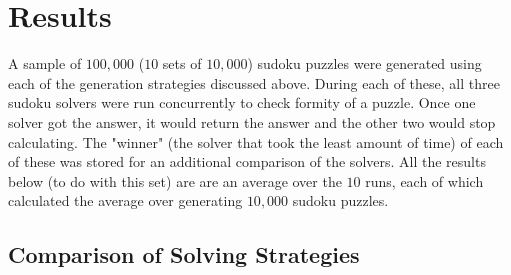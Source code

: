 
\section{Results}

A sample of $100,000$ ($10$ sets of $10,000$) sudoku puzzles were generated using each of the generation strategies discussed above.
During each of these, all three sudoku solvers were run concurrently to check formity of a puzzle. Once one solver got the answer,
it would return the answer and the other two would stop calculating. The "winner" (the solver that took the least amount of time) of each
of these was stored for an additional comparison of the solvers. All the results below (to do with this set) are are an average over
the $10$ runs, each of which calculated the average over generating $10,000$ sudoku puzzles.

\subsection{Comparison of Solving Strategies}

